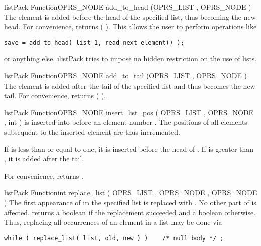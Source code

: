 \begin{typefn}{listPack Function}{OPRS\_NODE} {add\_to\_head} {(OPRS\_LIST , OPRS\_NODE
)}
The element is added before the head of the specified list, thus becoming the
new head. For convenience,  returns (
). This allows the user to perform operations like
\begin{verbatim}
save = add_to_head( list_1, read_next_element() );
\end{verbatim}
or anything else.  \i{listPack} tries to impose
no hidden restriction on the use of lists.
\end{typefn}

\begin{typefn}{listPack Function}{OPRS\_NODE} {add\_to\_tail} {(OPRS\_LIST , OPRS\_NODE
)}
The element is added after the tail of the specified list and thus becomes the
new tail. For convenience,  returns (
).
\end{typefn}

\begin{typefn}{listPack Function}{OPRS\_NODE} {insert\_list\_pos} {( OPRS\_LIST ,
OPRS\_NODE , int )}
 is inserted into 
before an element number . The positions of all elements
subsequent to the inserted element are thus incremented.

If  is less than or equal to one, it is inserted before the head of
. If  is greater than , it is
added after the tail.

For convenience,  returns .
\end{typefn}

\begin{typefn}{listPack Function}{int} {replace\_list} {( OPRS\_LIST , OPRS\_NODE
, OPRS\_NODE )}
The first appearance of  in the specified list is replaced
with . No other part of  is affected.  returns a boolean
 if the replacement succeeded and a boolean
 otherwise. Thus, replacing all occurrences of an element in a
list may be done via
\begin{verbatim}
while ( replace_list( list, old, new ) )    /* null body */ ;
\end{verbatim}
\end{typefn}

